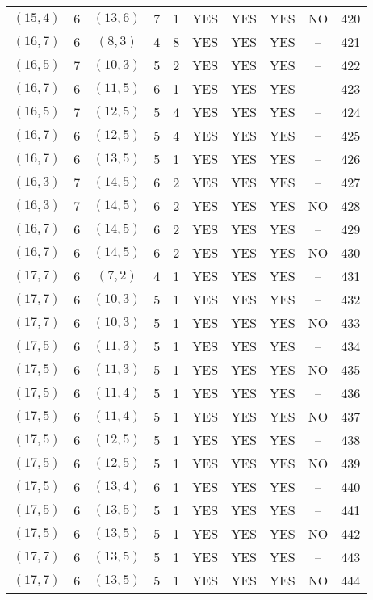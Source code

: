 \begin{longtable}{|c|c|c|c|c|c|c|c|c|c|}
$(15, 4)$ & 6 & $(13, 6)$ & 7 & 1 & YES & YES & YES & NO & 420\\
$(16, 7)$ & 6 & $(8, 3)$ & 4 & 8 & YES & YES & YES & -- & 421\\
$(16, 5)$ & 7 & $(10, 3)$ & 5 & 2 & YES & YES & YES & -- & 422\\
$(16, 7)$ & 6 & $(11, 5)$ & 6 & 1 & YES & YES & YES & -- & 423\\
$(16, 5)$ & 7 & $(12, 5)$ & 5 & 4 & YES & YES & YES & -- & 424\\
$(16, 7)$ & 6 & $(12, 5)$ & 5 & 4 & YES & YES & YES & -- & 425\\
$(16, 7)$ & 6 & $(13, 5)$ & 5 & 1 & YES & YES & YES & -- & 426\\
$(16, 3)$ & 7 & $(14, 5)$ & 6 & 2 & YES & YES & YES & -- & 427\\
$(16, 3)$ & 7 & $(14, 5)$ & 6 & 2 & YES & YES & YES & NO & 428\\
$(16, 7)$ & 6 & $(14, 5)$ & 6 & 2 & YES & YES & YES & -- & 429\\
$(16, 7)$ & 6 & $(14, 5)$ & 6 & 2 & YES & YES & YES & NO & 430\\
$(17, 7)$ & 6 & $(7, 2)$ & 4 & 1 & YES & YES & YES & -- & 431\\
$(17, 7)$ & 6 & $(10, 3)$ & 5 & 1 & YES & YES & YES & -- & 432\\
$(17, 7)$ & 6 & $(10, 3)$ & 5 & 1 & YES & YES & YES & NO & 433\\
$(17, 5)$ & 6 & $(11, 3)$ & 5 & 1 & YES & YES & YES & -- & 434\\
$(17, 5)$ & 6 & $(11, 3)$ & 5 & 1 & YES & YES & YES & NO & 435\\
$(17, 5)$ & 6 & $(11, 4)$ & 5 & 1 & YES & YES & YES & -- & 436\\
$(17, 5)$ & 6 & $(11, 4)$ & 5 & 1 & YES & YES & YES & NO & 437\\
$(17, 5)$ & 6 & $(12, 5)$ & 5 & 1 & YES & YES & YES & -- & 438\\
$(17, 5)$ & 6 & $(12, 5)$ & 5 & 1 & YES & YES & YES & NO & 439\\
$(17, 5)$ & 6 & $(13, 4)$ & 6 & 1 & YES & YES & YES & -- & 440\\
$(17, 5)$ & 6 & $(13, 5)$ & 5 & 1 & YES & YES & YES & -- & 441\\
$(17, 5)$ & 6 & $(13, 5)$ & 5 & 1 & YES & YES & YES & NO & 442\\
$(17, 7)$ & 6 & $(13, 5)$ & 5 & 1 & YES & YES & YES & -- & 443\\
$(17, 7)$ & 6 & $(13, 5)$ & 5 & 1 & YES & YES & YES & NO & 444\\

\end{longtable}
